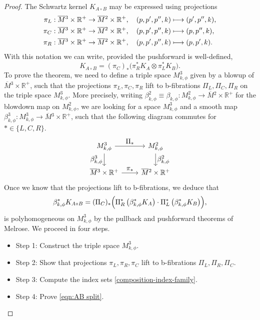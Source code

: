 \documentclass[11pt]{article}
\numberwithin{equation}{section}
\newcommand\mto{\mathchoice{\longmapsto}{\mapsto}{\mapsto}{\mapsto}}
\let\ts\textstyle
\theoremstyle{plain}
\theoremstyle{definition}
\newcommand{\R}{{\mathbb{R}}}
\newcommand{\Mbar}{{\overline{M}}}\let\M\Mbar
\begin{document}
\begin{proof}
The Schwartz kernel $K_{A \circ B}$ may be expressed using projections
\begin{align*}
\pi_{L} &:\Mbar{}^3\times \R^+ \to \Mbar{}^2\times \R^+, \quad (p,p',p'',k) \mto (p',p'',k),\\
\pi_{C} &:\Mbar{}^3\times \R^+ \to \Mbar{}^2\times \R^+, \quad (p,p',p'',k) \mto (p,p'',k),\\
\pi_{R} &:\Mbar{}^3\times \R^+ \to \Mbar{}^2\times \R^+, \quad (p,p',p'',k) \mto (p,p',k).
\end{align*}
With this notation we can write, provided the pushforward is well-defined,
\[
K_{A \circ B} = (\pi_{C})_{*} \bigl(\pi_{R}^{*}K_{A}\otimes \pi_{L}^{*}K_{B} \bigr).
\]
To prove the theorem, we need to define a triple space $M^{3}_{k,\phi}$ given by a blowup of $\Mbar{}^3\times \R^+$,
such that the projections $\pi_{L}, \pi_{C}, \pi_{R}$ lift to b-fibrations
$\Pi_{L}, \Pi_{C}, \Pi_{R}$ on the triple space $M^{3}_{k,\phi}$. More precisely,
writing $\beta_{k,\phi}^2 \equiv \beta_{k,\phi}: M^{2}_{k,\phi} \to \Mbar{}^2 \times \R^+$ for the blowdown map on $M^{2}_{k,\phi}$,
we are looking for a space $M^{3}_{k,\phi}$ and a smooth map
$\beta_{k,\phi}^3: M^{3}_{k,\phi} \to \Mbar{}^3\times \R^+$,
such that the following diagram commutes for $* \in \{ L,C,R\}$.
\[
\begin{tikzcd} M^{3}_{k,\phi}\arrow[r, "\ts\Pi_{*}" ]\arrow["\ts\beta^{3}_{k,\phi}"',d]& M^{2}_{k,\phi}
\arrow[d, "\ts\beta^{2}_{k,\phi}"] \\\Mbar{}^3\times \R^+
\arrow[r, "\ts\pi_{*}"]& \Mbar{}^2\times \R^+
\end{tikzcd}
\]
Once we know that the projections lift to b-fibrations, we deduce that
\begin{equation}
\label{eqn:composition phi formula}
\beta_{k,\phi}^* K_{A \circ B} = (\Pi_{C})_{*} \Bigl(\Pi_{R}^{*} \left(\beta_{k,\phi}^* K_{A} \right) \cdot
\Pi_{L}^{*} \left(\beta_{k,\phi}^* K_{B}\right) \Bigr),
\end{equation}
is polyhomogeneous on $M^{3}_{k,\phi}$ by the pullback and pushforward theorems of Melrose.
We proceed in four steps.

\begin{itemize}
\item Step 1: Construct the triple space $M^{3}_{k,\phi}$.
\item Step 2: Show that projections $\pi_{L}, \pi_{R}, \pi_{C}$
lift to b-fibrations $\Pi_{L}, \Pi_{R}, \Pi_{C}$.
\item Step 3: Compute the index sets \eqref{composition-index-family}.
\item Step 4: Prove \eqref{eqn:AB split}.
\end{itemize}


\end{proof}
\end{document}
